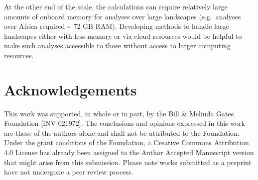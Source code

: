 \documentclass[
  10pt,
  letterpaper,
]{article}
\begin{document}
At the other end of the scale, the calculations can require relatively
large amounts of onboard memory for analyses over large landscapes
(e.g.~analyses over Africa required \textasciitilde{} 72 GB RAM).
Developing methods to handle large landscapes either with less memory or
via cloud resources would be helpful to make such analyses accessible to
those without access to larger computing resources.

\section{Acknowledgements}\label{acknowledgements}

This work was supported, in whole or in part, by the Bill \& Melinda
Gates Foundation {[}INV-021972{]}. The conclusions and opinions
expressed in this work are those of the authors alone and shall not be
attributed to the Foundation. Under the grant conditions of the
Foundation, a Creative Commons Attribution 4.0 License has already been
assigned to the Author Accepted Manuscript version that might arise from
this submission. Please note works submitted as a preprint have not
undergone a peer review process.


\renewcommand\refname{References}
  
\end{document}
